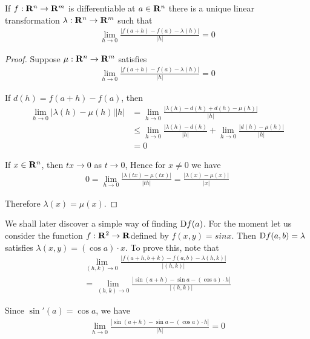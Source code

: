 \begin{theorem}
    If $f:\mathbf{R}^n\to \mathbf{R}^m$ is differentiable at $a\in \mathbf{R}^n$ there is a unique linear 
    transformation $\lambda: \mathbf{R}^n\to \mathbf{R}^m$ such that
    \begin{align*}
        \lim_{h\to 0 }{\frac{|f(a+h)-f(a)-\lambda(h)|}{|h|}} = 0
    \end{align*}
\end{theorem}

\begin{proof}
    Suppose $\mu:\mathbf{R}^n\to \mathbf{R}^m$ satisfies 
    \begin{align*}
        \lim_{h\to 0 }{\frac{|f(a+h)-f(a)-\lambda(h)|}{|h|}} = 0
    \end{align*}

    If $d(h) = f(a+h) - f(a)$, then
    \begin{align*}
        \lim_{h\to 0 }{|\lambda(h)-\mu(h)|}{|h|}
        & = \lim_{h\to 0}{\frac{|\lambda(h) - d(h) + d(h) - \mu(h)|}{|h|}} \\
        & \le \lim_{h\to 0}{\frac{|\lambda(h) - d(h)}{|h|}} + \lim_{h\to 0}{\frac{|d(h) - \mu(h)|}{|h|}} \\
        & = 0
    \end{align*}

    If $x\in \mathbf{R}^n$, then $tx\to 0$ as $t\to 0$, Hence for $x\neq 0$ we have 
    \begin{align*}
        0 = \lim_{h\to 0}{\frac{|\lambda(tx) - \mu(tx)|}{|th|}} = \frac{|\lambda(x) - \mu(x)|}{|x|}
    \end{align*}

    Therefore $\lambda(x) = \mu(x)$.
\end{proof}

We shall later discover a simple way of finding $\mathrm{D}f(a)$. For
the moment let us consider the function $f:\mathbf{R}^2 \to \mathbf{R}$defined by
$f(x,y) = sin x$. Then $\mathrm{D}f(a,b) = \lambda$ satisfies $\lambda(x,y) = (\cos a)\cdot x$.
To prove this, note that
\begin{align*}
    \lim_{(h, k)\to 0}{\frac{|f(a+h, b+k) - f(a, b) - \lambda(h, k)|}{|(h, k)|}}\\
        = \lim_{(h, k)\to 0}{\frac{|\sin(a+h) - \sin a - (\cos a)\cdot h|}{|(h, k)|}}
\end{align*}

Since $\sin'(a) = \cos a$, we have 
\begin{align*}
    \lim_{h\to 0}{\frac{|\sin(a+h) - \sin a - (\cos a)\cdot h|}{|h|}} = 0
\end{align*}

